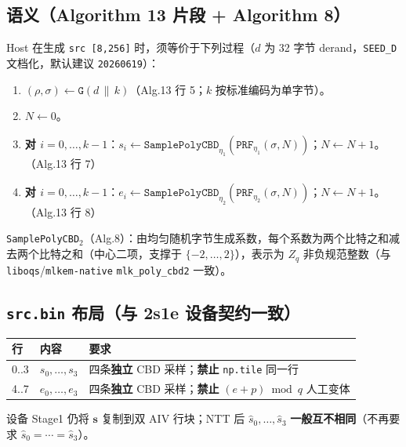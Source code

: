 \documentclass[UTF8,a4paper,11pt]{ctexart}
\begin{document}
\subsection{语义（Algorithm 13 片段 + Algorithm 8）}
Host 在生成 \texttt{src [8,256]} 时，须等价于下列过程（$d$ 为 32 字节 derand，\texttt{SEED\_D} 文档化，默认建议 \texttt{20260619}）：

\begin{enumerate}
  \item $(\rho,\sigma)\leftarrow \texttt{G}(d\,\|\,k)$（Alg.13 行 5；$k$ 按标准编码为单字节）。
  \item $N\leftarrow 0$。
  \item \textbf{对 $i=0,\ldots,k{-}1$}：$s_i \leftarrow \texttt{SamplePolyCBD}_{\eta_1}(\texttt{PRF}_{\eta_1}(\sigma,N))$；$N\leftarrow N{+}1$。（Alg.13 行 7）
  \item \textbf{对 $i=0,\ldots,k{-}1$}：$e_i \leftarrow \texttt{SamplePolyCBD}_{\eta_2}(\texttt{PRF}_{\eta_2}(\sigma,N))$；$N\leftarrow N{+}1$。（Alg.13 行 8）
\end{enumerate}

\texttt{SamplePolyCBD}$_2$（Alg.8）：由均匀随机字节生成系数，每个系数为两个比特之和减去两个比特之和（中心二项，支撑于 $\{-2,\ldots,2\}$），表示为 $Z_q$ 非负规范整数（与 \texttt{liboqs}/\texttt{mlkem-native} \texttt{mlk\_poly\_cbd2} 一致）。

\subsection{\texttt{src.bin} 布局（与 2s1e 设备契约一致）}
\begin{table}[h]
  \centering
  \begin{tabular}{@{}lll@{}}
    \toprule
    行 & 内容 & 要求 \\
    \midrule
    0..3 & $s_0,\ldots,s_3$ & 四条\textbf{独立} CBD 采样；\textbf{禁止} \texttt{np.tile} 同一行 \\
    4..7 & $e_0,\ldots,e_3$ & 四条\textbf{独立} CBD 采样；\textbf{禁止} $(e{+}p)\bmod q$ 人工变体 \\
    \bottomrule
  \end{tabular}
\end{table}

设备 Stage1 仍将 $\mathbf{s}$ 复制到双 AIV 行块；NTT 后 $\hat{s}_0,\ldots,\hat{s}_3$ \textbf{一般互不相同}（不再要求 $\hat{s}_0{=}\cdots{=}\hat{s}_3$）。
\end{document}
